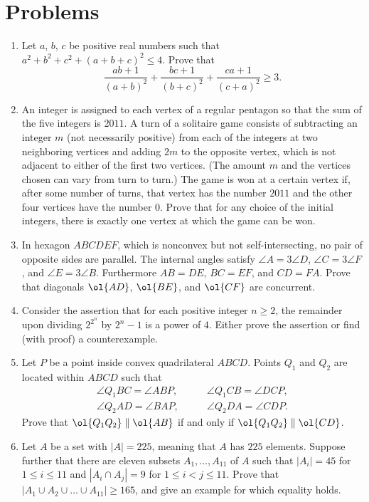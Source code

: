 \documentclass[11pt]{scrartcl}
\begin{document}
\section{Problems}
\begin{enumerate}[\bfseries 1.]
\item %
Let $a$, $b$, $c$ be positive real numbers
such that $a^2+b^2+c^2+(a+b+c)^2 \le 4$. Prove that
\[ \frac{ab+1}{(a+b)^2}
  + \frac{bc+1}{(b+c)^2}
  + \frac{ca+1}{(c+a)^2} \ge 3. \]

\item %
An integer is assigned to each vertex of a regular pentagon
so that the sum of the five integers is $2011$.
A turn of a solitaire game consists of subtracting an integer $m$
(not necessarily positive) from each of the integers at two neighboring vertices
and adding $2m$ to the opposite vertex, which is not adjacent
to either of the first two vertices.
(The amount $m$ and the vertices chosen can vary from turn to turn.)
The game is won at a certain vertex if, after some number of turns,
that vertex has the number $2011$ and the other four vertices have the number $0$.
Prove that for any choice of the initial integers,
there is exactly one vertex at which the game can be won.

\item %
In hexagon $ABCDEF$, which is nonconvex but not self-intersecting,
no pair of opposite sides are parallel.
The internal angles satisfy
$\angle A=3\angle D$, $\angle C=3\angle F$, and $\angle E=3\angle B$.
Furthermore $AB=DE$, $BC=EF$, and $CD=FA$.
Prove that diagonals $\ol{AD}$, $\ol{BE}$, and $\ol{CF}$
are concurrent.

\item %
Consider the assertion that for each positive integer $n\geq2$,
the remainder upon dividing $2^{2^n}$ by $2^n-1$ is a power of $4$.
Either prove the assertion or find (with proof) a counterexample.

\item %
Let $P$ be a point inside convex quadrilateral $ABCD$.
Points $Q_1$ and $Q_2$ are located within $ABCD$ such that
\begin{align*}
\angle Q_1BC=\angle ABP, & \qquad \angle Q_1CB=\angle DCP, \\
\angle Q_2AD=\angle BAP, & \qquad \angle Q_2DA=\angle CDP.
\end{align*}
Prove that $\ol{Q_1Q_2} \parallel \ol{AB}$
if and only if $\ol{Q_1Q_2} \parallel \ol{CD}$.

\item %
Let $A$ be a set with $|A|=225$, meaning that $A$ has $225$ elements.
Suppose further that there are eleven subsets $A_1, \dots, A_{11}$ of $A$
such that $|A_i|=45$ for $1\leq i\leq11$ and $|A_i\cap A_j|=9$
for $1\leq i<j\leq11$.
Prove that $|A_1\cup A_2\cup\dots\cup A_{11}|\geq 165$,
and give an example for which equality holds.

\end{enumerate}
\pagebreak
\end{document}
